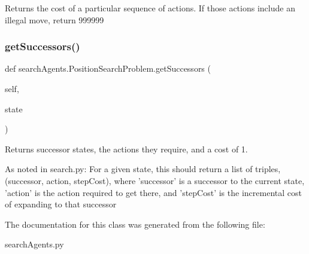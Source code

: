 \begin{DoxyVerb}Returns the cost of a particular sequence of actions.  If those actions
include an illegal move, return 999999
\end{DoxyVerb}
 \mbox{\label{classsearch_agents_1_1_position_search_problem_a0bdc0dc758b100e61188e2335b763fbf}} 
\subsubsection{\texorpdfstring{get\+Successors()}{getSuccessors()}}
{\footnotesize\ttfamily def search\+Agents.\+Position\+Search\+Problem.\+get\+Successors (\begin{DoxyParamCaption}\item[{}]{self,  }\item[{}]{state }\end{DoxyParamCaption})}

\begin{DoxyVerb}Returns successor states, the actions they require, and a cost of 1.

 As noted in search.py:
     For a given state, this should return a list of triples,
 (successor, action, stepCost), where 'successor' is a
 successor to the current state, 'action' is the action
 required to get there, and 'stepCost' is the incremental
 cost of expanding to that successor
\end{DoxyVerb}
 

The documentation for this class was generated from the following file\+:\begin{DoxyCompactItemize}
\item 
search\+Agents.\+py\end{DoxyCompactItemize}
